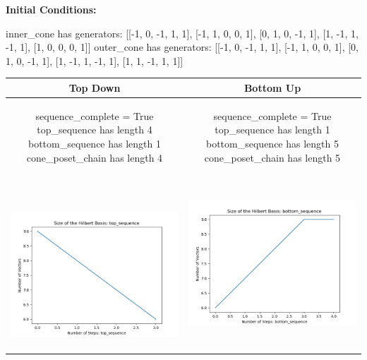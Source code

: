 \documentclass[10pt]{article}
\begin{document}
\textbf{Initial Conditions:}
\begin{SAGE}
inner_cone has generators: 
[[-1, 0, -1, 1, 1], [-1, 1, 0, 0, 1], [0, 1, 0, -1, 1], [1, -1, 1, -1, 1], [1, 0, 0, 0, 1]]
outer_cone has generators: 
[[-1, 0, -1, 1, 1], [-1, 1, 0, 0, 1], [0, 1, 0, -1, 1], [1, -1, 1, -1, 1], [1, 1, -1, 1, 1]]

\end{SAGE}
\begin{tabular}{c|c}
\textbf{Top Down} & \textbf{Bottom Up} \\ \hline  
\begin{SAGE}
	sequence_complete = True
	top_sequence has length 4
	bottom_sequence has length 1
	cone_poset_chain has length 4
\end{SAGE} 
&
\begin{SAGE}
	sequence_complete = True
	top_sequence has length 1
	bottom_sequence has length 5
	cone_poset_chain has length 5
\end{SAGE} 
\\ \hline
\
\begin{minipage}{.45\textwidth}
\includegraphics[width=\textwidth]{"DATA/5d/5 generators 1 bound D/top_sequence SIZE"}
\end{minipage} &
\begin{minipage}{.45\textwidth}
\includegraphics[width=\textwidth]{"DATA/5d/5 generators 1 bound D bottomup/bottom_sequence SIZE"}

\end{minipage}
\end{tabular}
\end{document}
